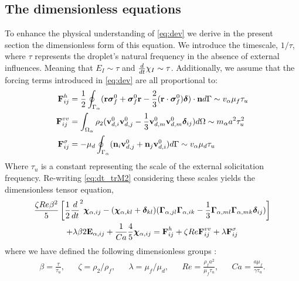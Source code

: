 \subsection{The dimensionless equations}


To enhance the physical understanding of \ref{eq:dev} we derive in the present section the dimensionless form of this equation. 
We introduce the timescale, $1/\tau$, where $\tau$ represents the droplet's natural frequency in the absence of external influences.
Meaning that $E_I\sim \tau$ and $\frac{d}{dt} \chi_I \sim \tau$. 
Additionally, we assume that the forcing terms introduced in \ref{eq:dev} are all proportional to: 
\begin{align*}
    \textbf{F}_{ij}^h
    &= \frac{1}{2}\oint_{\Gamma_{\alpha}} (\textbf{r}\bm\sigma_f^0 + \bm\sigma_f^0\textbf{r} - \frac{2}{3}(\textbf{r}\cdot \bm\sigma_f^0) \bm\delta)\cdot \textbf{n} d\Gamma 
    \sim v_\alpha \mu_f\tau_u \\
    \textbf{F}_{ij}^{vv}
    &= \int_{\Omega_{\alpha}} \rho_2 (\textbf{v}_{d,i}^0\textbf{v}_{d,j}^0 - \frac{1}{3}\textbf{v}_{d,m}^0\textbf{v}_{d,m}^0 \bm\delta_{ij})  d\Omega
    \sim  m_\alpha a^2\tau_u^2 \\
    \textbf{F}_{ij}^{\sigma}
    &= - \mu_d \oint_{\Gamma_{\alpha}} (\textbf{n}_i \textbf{v}_{d,j}^0 + \textbf{n}_j \textbf{v}_{d,i}^0) d\Gamma
    \sim  v_\alpha \mu_d\tau_u
\end{align*}
Where $\tau_u$ is a constant representing the scale of the external solicitation frequency. 
Re-writing \ref{eq:dt_trM2} considering these scales yields the dimensionless tensor equation, 
\begin{multline}
    \frac{\zeta Re \beta^2}{5}
    \left[
        \frac{1}{2}\ddt^2 \bm\chi_{\alpha,ij}
        -   (\bm\chi_{\alpha,kl} + \bm\delta_{kl})
        (\bm\Gamma_{\alpha,jl}\bm\Gamma_{\alpha,ik}  
        - \frac{1}{3}
        \bm\Gamma_{\alpha,ml}\bm\Gamma_{\alpha,mk}  
        \bm\delta_{ij}
        )
    \right]\\
    + \lambda \beta 2 \textbf{E}_{\alpha,ij}
    + \frac{1}{Ca}
    \frac{4  }{5} \bm\chi_{\alpha,ij}
    = \textbf{F}_{ij}^h 
    + \zeta Re \textbf{F}_{ij}^{vv}
    + \lambda \textbf{F}_{ij}^{\sigma}
    \label{eq:dev_dim}
\end{multline}
where we have defined the following dimensionless groups : 
\begin{align*}
    \beta = \frac{\tau}{\tau_u},
    && \zeta = \rho_2 /\rho_f,
    && \lambda = \mu_f/\mu_d ,
    && Re = \frac{\rho_f a^2 }{ \mu_f \tau_u},
    && Ca = \frac{a \mu_f}{\gamma \tau_u}. 
\end{align*}
